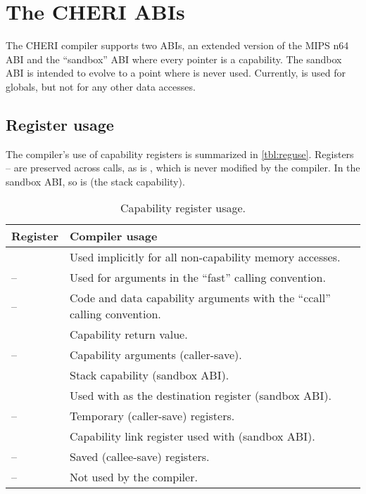 \chapter{The CHERI ABIs}
\label{chp:abis}

The CHERI compiler supports two ABIs, an extended version of the MIPS n64 ABI and the ``sandbox'' ABI where every pointer is a capability.
The sandbox ABI is intended to evolve to a point where  is never used.
Currently,  is used for globals, but not for any other data accesses.

\section{Register usage}

The compiler's use of capability registers is summarized in \autoref{tbl:reguse}.
Registers -- are preserved across calls, as is , which is never modified by the compiler.
In the sandbox ABI, so is  (the stack capability).

\begin{table}
	\begin{center}
		\begin{tabu}{ll}
			\toprule
			\headerrow
			Register             & Compiler usage \\
			\midrule
			             & Used implicitly for all non-capability memory accesses.\\
			--  & Used for arguments in the ``fast'' calling convention. \\
			--   & Code and data capability arguments with the ``ccall'' calling convention. \\
			             & Capability return value. \\
			--  & Capability arguments (caller-save). \\
			            & Stack capability (sandbox ABI). \\
			            & Used with  as the destination register (sandbox ABI). \\
			-- & Temporary (caller-save) registers.\\
			            & Capability link register used with  (sandbox ABI).\\
			-- & Saved (callee-save) registers. \\
			-- & Not used by the compiler.\\
			\bottomrule
		\end{tabu}
		\caption{\label{tbl:reguse}Capability register usage.}
	\end{center}
\end{table}


